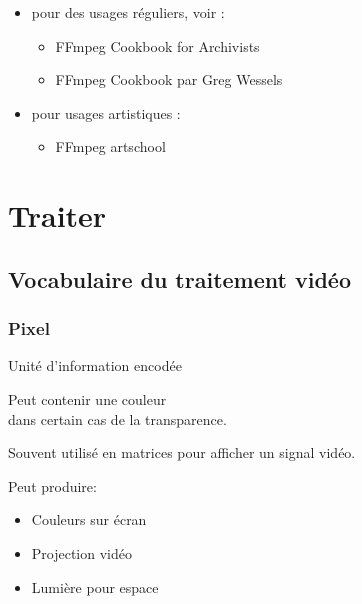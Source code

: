 \documentclass[
  french,
]{book}
\providecommand{\tightlist}{%
  \setlength{\itemsep}{0pt}\setlength{\parskip}{0pt}}
\begin{document}
\begin{itemize}
\item
  pour des usages réguliers, voir :

  \begin{itemize}
  \tightlist
  \item
    FFmpeg Cookbook for Archivists \citep{kromer_FFmpegCookbookArchivists_2020}
  \item
    FFmpeg Cookbook par Greg Wessels \citep{wessels_FFmpegCookbook_2017}
  \end{itemize}
\item
  pour usages artistiques :

  \begin{itemize}
  \tightlist
  \item
    FFmpeg artschool \citep{associationofmovingimagearchivists_FFmpegArtschool_2020}
  \end{itemize}
\end{itemize}

\hypertarget{traiter}{%
\chapter{Traiter}\label{traiter}}

\hypertarget{vocabulaire-du-traitement-viduxe9o}{%
\section{Vocabulaire du traitement vidéo}\label{vocabulaire-du-traitement-viduxe9o}}

\hypertarget{pixel}{%
\subsection{Pixel}\label{pixel}}

Unité d'information encodée

Peut contenir une couleur\\
dans certain cas de la transparence.

Souvent utilisé en matrices pour afficher un signal vidéo.

Peut produire:

\begin{itemize}
\tightlist
\item
  Couleurs sur écran
\item
  Projection vidéo
\item
  Lumière pour espace
\end{itemize}
\end{document}
